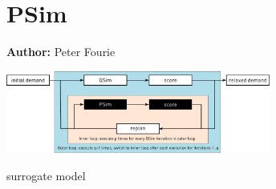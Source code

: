 \chapter{PSim }
\label{ch:psim}

\hfill \textbf{Author:} Peter Fourie

\begin{center} \includegraphics[width=0.65\textwidth, angle=0]{extending/figures/PSim/psim.pdf} \end{center}


surrogate model \citep[][]{FourieEtAl_TRR_2013, FourieEtAl_TechRep_IVT_2012}

